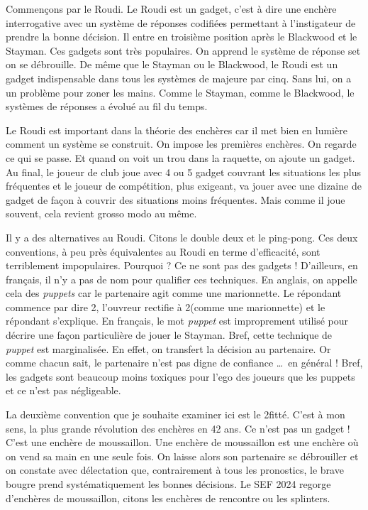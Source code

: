 Commençons par le Roudi. Le Roudi est un gadget, c'est à dire une enchère interrogative avec un système de réponses codifiées permettant à l'instigateur de prendre la bonne décision. Il entre en troisième position après le Blackwood et le Stayman. Ces gadgets sont très populaires. On apprend le système de réponse set on se débrouille. De même que le Stayman ou le Blackwood, le Roudi est un gadget indispensable dans tous les systèmes de majeure par cinq. Sans lui, on a un problème pour zoner les mains. Comme le Stayman, comme le Blackwood, le systèmes de réponses a évolué au fil du temps.

Le Roudi est important dans la théorie des enchères car il met bien en lumière comment un système se construit. On impose les premières enchères. On regarde ce qui se passe. Et quand on voit un trou dans la raquette, on ajoute un gadget. Au final, le joueur de club joue avec 4 ou 5 gadget couvrant les situations les plus fréquentes et le joueur de compétition, plus exigeant, va jouer avec une dizaine de gadget de façon à couvrir des situations moins fréquentes. Mais comme il joue souvent, cela revient grosso modo au même.

Il y a des alternatives au Roudi. Citons le double deux et le ping-pong. Ces deux conventions, à peu près équivalentes au Roudi en terme d'efficacité, sont terriblement impopulaires. Pourquoi ? Ce ne sont pas des gadgets ! D'ailleurs, en français, il n'y a pas de nom pour qualifier ces techniques. En anglais, on appelle cela des \textit{puppets} car le partenaire agit comme une marionnette. Le répondant commence par dire 2\T, l'ouvreur rectifie à 2\K (comme une marionnette) et le répondant s'explique. En français, le mot \textit{puppet}
est improprement utilisé pour décrire une façon particulière de jouer le Stayman. Bref, cette technique de \textit{puppet} est marginalisée. En effet, on transfert la décision au partenaire. Or comme chacun sait, le partenaire n'est pas digne de confiance \dots\ en général ! Bref, les gadgets sont beaucoup moins toxiques pour l'ego des joueurs que les puppets et ce n'est pas négligeable.

La deuxième convention que je souhaite examiner ici est le 2\NT fitté. C'est à mon sens, la plus grande révolution des enchères en 42 ans. Ce n'est pas un gadget ! C'est une enchère de moussaillon. Une enchère de moussaillon est une enchère où on vend sa main en une seule fois. On laisse alors son partenaire se débrouiller et on constate avec délectation que, contrairement à tous les pronostics, le brave bougre prend systématiquement les bonnes décisions. Le SEF 2024 regorge d'enchères de moussaillon, citons les enchères de rencontre ou les splinters.


